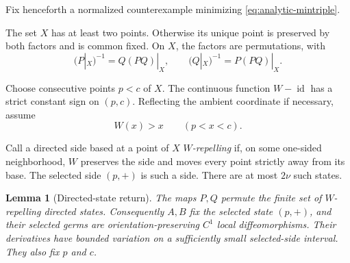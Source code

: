 \documentclass[11pt]{article}
\newtheorem{lemma}[theorem]{Lemma}
\theoremstyle{definition}
\theoremstyle{remark}
\newcommand{\id}{\operatorname{id}}
\begin{document}
Fix henceforth a normalized counterexample minimizing
\eqref{eq:analytic-mintriple}.

The set \(X\) has at least two points.  Otherwise its unique point is
preserved by both factors and is common fixed.  On \(X\), the factors are
permutations, with
\begin{equation}\label{eq:analytic-X-inverses}
 (P|_X)^{-1}=Q(PQ)|_X,\qquad
 (Q|_X)^{-1}=P(PQ)|_X.
\end{equation}

Choose consecutive points \(p<c\) of \(X\).  The continuous function
\(W-\id\) has a strict constant sign on \((p,c)\).  Reflecting the ambient
coordinate if necessary, assume
\begin{equation}\label{eq:analytic-gap-sign}
 W(x)>x\qquad(p<x<c).
\end{equation}

Call a directed side based at a point of \(X\) \emph{\(W\)-repelling} if,
on some one-sided neighborhood, \(W\) preserves the side and moves every
point strictly away from its base.  The selected side \((p,+)\) is such a
side.  There are at most \(2\nu\) such states.

\begin{lemma}[Directed-state return]\label{lem:analytic-states}
The maps \(P,Q\) permute the finite set of \(W\)-repelling directed states.
Consequently \(A,B\) fix the selected state \((p,+)\), and their selected
germs are orientation-preserving \(C^1\) local diffeomorphisms.  Their
derivatives have bounded variation on a sufficiently small selected-side
interval.  They also
fix \(p\) and \(c\).
\end{lemma}
\end{document}
